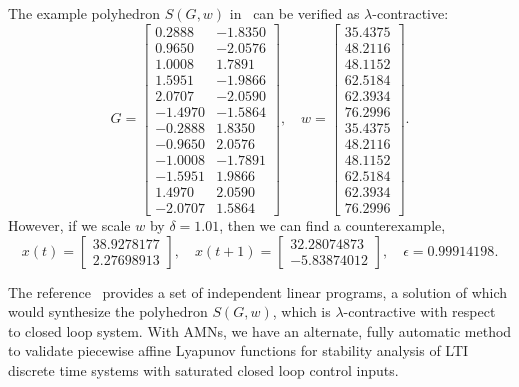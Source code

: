 The example polyhedron $S(G,w)$ in~\cite{Milani:1999} can be verified as
$\lambda$-contractive:
\[
	G = \begin{bmatrix}
	0.2888 & -1.8350 \\
	0.9650 & -2.0576 \\
	1.0008 & 1.7891 \\
	1.5951 & -1.9866 \\
	2.0707 & -2.0590 \\
	-1.4970 & -1.5864 \\
	-0.2888 & 1.8350 \\
	-0.9650 & 2.0576 \\
	-1.0008 & -1.7891 \\
	- 1.5951 & 1.9866 \\
	1.4970 & 2.0590 \\
	- 2.0707 & 1.5864
	\end{bmatrix},
	\quad
	w = \begin{bmatrix}
	35.4375 \\
	48.2116 \\
	48.1152 \\
	62.5184 \\
	62.3934 \\
	76.2996 \\ 
	35.4375 \\
	48.2116 \\
	48.1152 \\
	62.5184 \\
	62.3934 \\
	76.2996 
	\end{bmatrix}.
\]
However, if we scale $w$ by $\delta = 1.01$, then we can find a counterexample,
\[
	x(t) = \begin{bmatrix} 
	38.9278177 \\ 2.27698913
	\end{bmatrix},
	\quad
	x(t+1) = \begin{bmatrix} 32.28074873 \\ -5.83874012	\end{bmatrix},
	\quad
	\epsilon = 0.99914198.
\]

The reference~\cite{Milani:1999} provides a set of independent linear programs,
a solution of which would synthesize the polyhedron $S(G,w)$, which is
$\lambda$-contractive with respect to closed loop system.  With AMNs, we have
an alternate, fully automatic method to validate piecewise affine Lyapunov
functions for stability analysis of LTI discrete time systems with saturated
closed loop control inputs.

